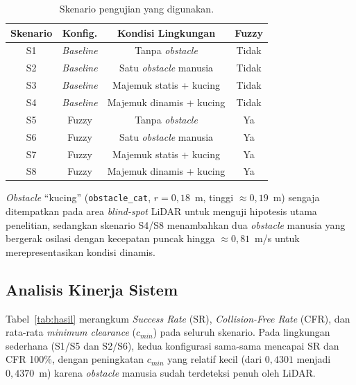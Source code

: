 \documentclass[10pt,twocolumn]{article}
\begin{document}
\begin{table}[!htb]
\centering
\caption{Skenario pengujian yang digunakan.}
\label{tab:skenario}
\footnotesize
\begin{tabular}{cccc}
\toprule
Skenario & Konfig. & Kondisi Lingkungan & Fuzzy \\
\midrule
S1 & \textit{Baseline} & Tanpa \textit{obstacle} & Tidak \\
S2 & \textit{Baseline} & Satu \textit{obstacle} manusia & Tidak \\
S3 & \textit{Baseline} & Majemuk statis + kucing & Tidak \\
S4 & \textit{Baseline} & Majemuk dinamis + kucing & Tidak \\
S5 & Fuzzy & Tanpa \textit{obstacle} & Ya \\
S6 & Fuzzy & Satu \textit{obstacle} manusia & Ya \\
S7 & Fuzzy & Majemuk statis + kucing & Ya \\
S8 & Fuzzy & Majemuk dinamis + kucing & Ya \\
\bottomrule
\end{tabular}
\end{table}

\textit{Obstacle} ``kucing'' (\texttt{obstacle\_cat}, $r=0{,}18$~m, tinggi $\approx0{,}19$~m) sengaja ditempatkan pada area \textit{blind-spot} LiDAR untuk menguji hipotesis utama penelitian, sedangkan skenario S4/S8 menambahkan dua \textit{obstacle} manusia yang bergerak osilasi dengan kecepatan puncak hingga $\approx0{,}81$~m/s untuk merepresentasikan kondisi dinamis.

\subsection{Analisis Kinerja Sistem}

Tabel~\ref{tab:hasil} merangkum \textit{Success Rate} (SR), \textit{Collision-Free Rate} (CFR), dan rata-rata \textit{minimum clearance} ($c_{min}$) pada seluruh skenario. Pada lingkungan sederhana (S1/S5 dan S2/S6), kedua konfigurasi sama-sama mencapai SR dan CFR 100\%, dengan peningkatan $c_{min}$ yang relatif kecil (dari $0{,}4301$ menjadi $0{,}4370$~m) karena \textit{obstacle} manusia sudah terdeteksi penuh oleh LiDAR.
\end{document}
